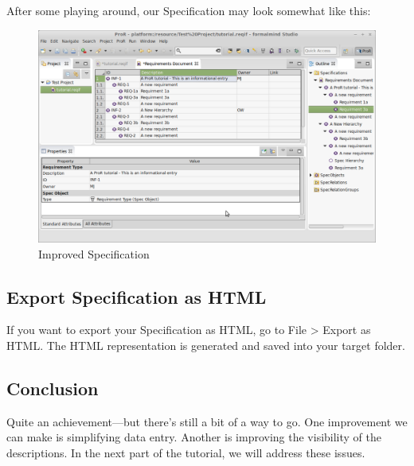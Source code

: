 After some playing around, our Specification may look somewhat like this:

\begin{figure}[H]
\centering      
\includegraphics[width=\linewidth]{../rmf-images/hierarchy_dad.png}      
\caption{Improved Specification}      
\label{fig:improvedSpec}
\end{figure}

\subsection{Export Specification as HTML}

If you want to export your Specification as HTML, go to File \textgreater{} Export as HTML.  The HTML representation is generated and saved into your target folder.

\subsection{Conclusion}

Quite an achievement—but there's still a bit of a way to go.  One improvement we can make is simplifying data entry.  Another is improving  the visibility of the descriptions.  In the next part of the tutorial, we will address these issues.

